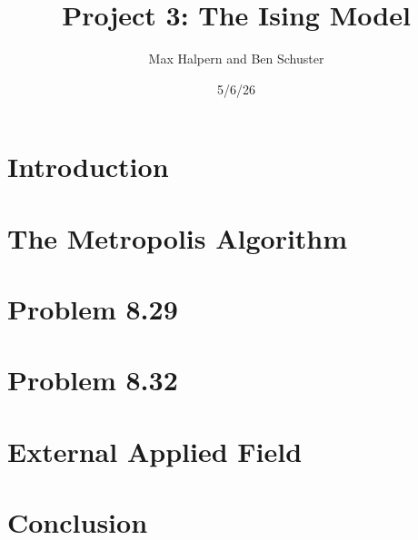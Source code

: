 \documentclass[12pt, letterpaper]{article}
\title{Project 3: The Ising Model}
\author{Max Halpern and Ben Schuster}
\date{5/6/26}
\begin{document}
\maketitle

\section{Introduction}


\section{The Metropolis Algorithm}


\section{Problem 8.29}


\section{Problem 8.32}


\section{External Applied Field}


\section{Conclusion}

\end{document}

